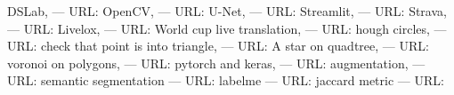 \documentclass[a4paper,12pt]{extarticle}
\begin{document}


\begin{thebibliography}{00}
 DSLab, --- URL: 
 OpenCV, --- URL: 
 U-Net, --- URL: 
 Streamlit, --- URL: 
 Strava, --- URL: 
 Livelox, --- URL: 
 World cup live translation, --- URL: 
 hough circles, --- URL: 
 check that point is into triangle, --- URL: 
 A star on quadtree, --- URL: 
 voronoi on polygons, --- URL: 
 pytorch and keras, --- URL: 
 augmentation, --- URL: 
 semantic segmentation --- URL: 
 labelme --- URL: 
 jaccard metric --- URL: 

\end{thebibliography}
	
	
\end{document}
